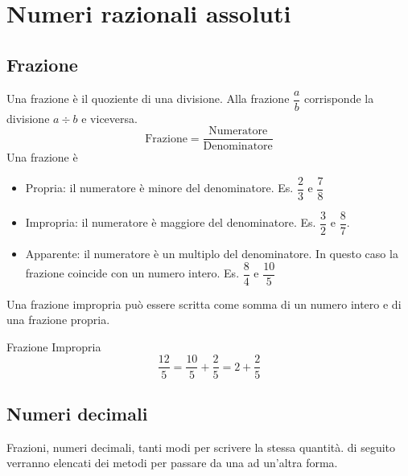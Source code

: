 \chapter{Numeri razionali assoluti}
\label{cha:NumeriRazionaliAssoluti}
\section{Frazione}
\label{sec:fraczioniNumRazASS}
Una frazione è il quoziente di una divisione. Alla frazione $\dfrac{a}{b}$ corrisponde la divisione $a\div b$ e viceversa.
\[
\text{Frazione}=
\dfrac{\text{Numeratore}}{\text{Denominatore}}
\]
Una frazione è\begin{itemize}
	\item Propria: il numeratore è minore del denominatore. Es. $\dfrac{2}{3}$ e $\dfrac{7}{8}$
	\item Impropria: il numeratore è maggiore del denominatore. Es. $\dfrac{3}{2}$ e $\dfrac{8}{7}$.
	\item Apparente: il numeratore è un multiplo del denominatore. In questo caso la frazione coincide con un numero intero. Es. $\dfrac{8}{4}$ e $\dfrac{10}{5}$
\end{itemize}
	Una frazione impropria può essere scritta come somma di un numero intero e di una frazione propria. 
	\begin{esempio}
	Frazione Impropria
	\[\dfrac{12}{5}=\dfrac{10}{5}+\dfrac{2}{5}=2+\dfrac{2}{5}\] 
	\end{esempio}
	\section{Numeri decimali}
Frazioni, numeri decimali, tanti modi per scrivere la stessa quantità. di seguito verranno elencati dei metodi per passare da una ad un'altra forma.
\label{Numeri decimali}
%	
